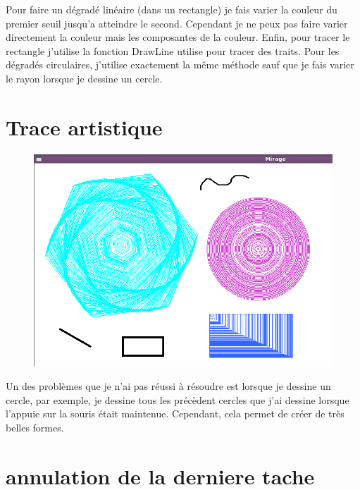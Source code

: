 \documentclass[12pt, a4paper]{report}
\begin{document}
Pour faire un dégradé linéaire (dans un rectangle) je fais varier la couleur du premier seuil jusqu’a atteindre le second. Cependant je ne peux pas faire varier directement la couleur mais les composantes de la couleur. Enfin, pour tracer le rectangle j’utilise la fonction DrawLine utilise pour tracer des traits.
Pour les dégradés circulaires, j’utilise exactement la même méthode sauf que je fais varier le rayon lorsque je dessine un cercle.


\newpage

\section {Trace artistique}

\begin{figure}[!h]
\begin{center} \includegraphics[width=1\textwidth]{images/tracebo.png} \end{center}
\end{figure}

Un des problèmes que je n’ai pas réussi à résoudre est lorsque je dessine un cercle, par exemple, je dessine tous les précèdent cercles que j’ai dessine lorsque l’appuie sur la souris était maintenue. Cependant, cela permet de créer de très belles formes. 


\newpage






\section {annulation de la derniere tache}
\end{document}
